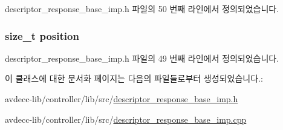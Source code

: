 descriptor\+\_\+response\+\_\+base\+\_\+imp.\+h 파일의 50 번째 라인에서 정의되었습니다.

\subsubsection[{\texorpdfstring{position}{position}}]{\setlength{\rightskip}{0pt plus 5cm}size\+\_\+t position\hspace{0.3cm}{\ttfamily [protected]}}\hypertarget{classavdecc__lib_1_1descriptor__response__base__imp_a7a04afe5347934be732ec70a70bd0a28}{}\label{classavdecc__lib_1_1descriptor__response__base__imp_a7a04afe5347934be732ec70a70bd0a28}


descriptor\+\_\+response\+\_\+base\+\_\+imp.\+h 파일의 49 번째 라인에서 정의되었습니다.



이 클래스에 대한 문서화 페이지는 다음의 파일들로부터 생성되었습니다.\+:\begin{DoxyCompactItemize}
\item 
avdecc-\/lib/controller/lib/src/\hyperlink{descriptor__response__base__imp_8h}{descriptor\+\_\+response\+\_\+base\+\_\+imp.\+h}\item 
avdecc-\/lib/controller/lib/src/\hyperlink{descriptor__response__base__imp_8cpp}{descriptor\+\_\+response\+\_\+base\+\_\+imp.\+cpp}\end{DoxyCompactItemize}
